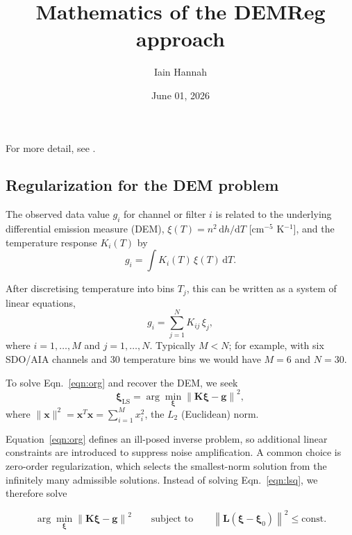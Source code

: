 \documentclass[12pt,a4paper]{article}
\title{Mathematics of the DEMReg approach}
\author{Iain Hannah}
\date{June 01, 2026}
\begin{document}
\maketitle\thispagestyle{fancy}

For more detail, see \citet{2012A&A...539A.146H,2013A&A...553A..10H,2004SoPh..225..293K,1992InvPr...8..849H}.

\vspace{-10pt}
\subsection*{Regularization for the DEM problem}

The observed data value $g_i$ for channel or filter $i$ is related to the underlying differential emission measure (DEM),
$\xi(T)=n^2\,\mathrm{d}h/\mathrm{d}T$ [cm$^{-5}$ K$^{-1}$], and the temperature response $K_i(T)$ by
\begin{equation}\label{eqn:org}
  g_i=\int K_i(T)\,\xi(T)\,\mathrm{d}T.
\end{equation}

After discretising temperature into bins $T_j$, this can be written as a system of linear equations,
\begin{equation}\label{eqn:le}
  g_i=\sum_{j=1}^{N} K_{ij}\,\xi_j,
\end{equation}
where $i=1,\ldots,M$ and $j=1,\ldots,N$. Typically $M<N$; for example, with six SDO/AIA channels and 30 temperature bins we would have $M=6$ and $N=30$.

To solve Eqn.~\ref{eqn:org} and recover the DEM, we seek
\begin{equation}\label{eqn:lsq}
  \boldsymbol{\xi}_{\mathrm{LS}}=\arg\min_{\boldsymbol{\xi}}\left\|\mathbf{K}\boldsymbol{\xi}-\mathbf{g}\right\|^2,
\end{equation}
where $\|\mathbf{x}\|^2=\mathbf{x}^T\mathbf{x}=\sum_{i=1}^{M} x_i^2$, the $L_2$ (Euclidean) norm.

Equation~\ref{eqn:org} defines an ill-posed inverse problem, so additional linear constraints are introduced to suppress noise amplification. A common choice is zero-order regularization, which selects the smallest-norm solution from the infinitely many admissible solutions. Instead of solving Eqn.~\ref{eqn:lsq}, we therefore solve

\begin{equation}
  \arg\min_{\boldsymbol{\xi}}\left\|\mathbf{K}\boldsymbol{\xi}-\mathbf{g}\right\|^2
  \qquad \text{subject to} \qquad
  \left\|\mathbf{L}(\boldsymbol{\xi}-\boldsymbol{\xi}_0)\right\|^2 \le \mathrm{const}.
\end{equation}
\end{document}
